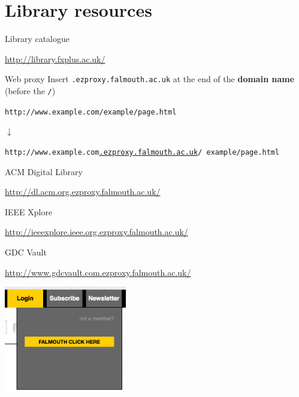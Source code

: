 \part{Library resources}
\frame{\partpage}

\begin{frame}{Library catalogue}
	\begin{center}
		\url{http://library.fxplus.ac.uk/}
	\end{center}
\end{frame}

\begin{frame}{Web proxy}
	Insert \texttt{.ezproxy.falmouth.ac.uk} at the end of the \textbf{domain name}
		(before the \texttt{/})
	\pause
	\begin{center}
		\texttt{http://www.example.com/example/page.html}
		
		\pause $\downarrow$
		
		\texttt{http://www.example.com\uline{.ezproxy.falmouth.ac.uk}/ example/page.html}
	\end{center}
\end{frame}

\begin{frame}{ACM Digital Library}
	\begin{center}
		\small\url{http://dl.acm.org.ezproxy.falmouth.ac.uk/}
	\end{center}
\end{frame}

\begin{frame}{IEEE Xplore}
	\begin{center}
		\small\url{http://ieeexplore.ieee.org.ezproxy.falmouth.ac.uk/}
	\end{center}
\end{frame}

\begin{frame}{GDC Vault}
	\begin{center}
		\small\url{http://www.gdcvault.com.ezproxy.falmouth.ac.uk/}
		
		\vspace{2ex}
		
		\includegraphics[width=0.4\textwidth]{gdc_login}
	\end{center}
\end{frame}

